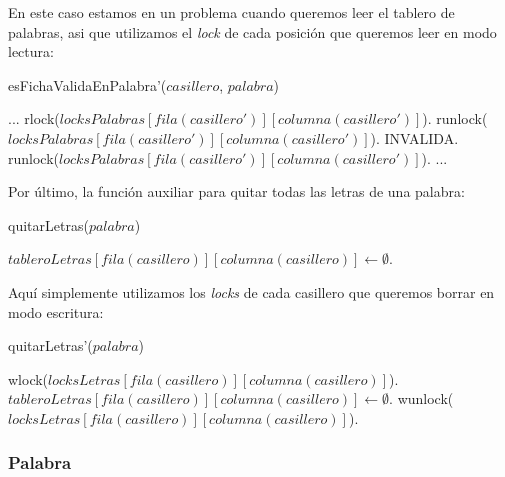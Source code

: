\noindent En este caso estamos en un problema cuando queremos leer el tablero de palabras, asi que utilizamos el \emph{lock} de cada posición que queremos leer en modo lectura:

\begin{algorithm}[H]
\caption{esFichaValidaEnPalabra'($casillero$, $palabra$)}
\begin{algorithmic}[1]
    \STATE ...
        \STATE rlock($locksPalabras[fila(casillero')][columna(casillero')]$).
            \STATE runlock($locksPalabras[fila(casillero')][columna(casillero')]$).
            \RETURN INVALIDA.
        \ENDIF
        \STATE runlock($locksPalabras[fila(casillero')][columna(casillero')]$).
    \ENDFOR
    \STATE ...
\end{algorithmic}
\end{algorithm}

Por último, la función auxiliar para quitar todas las letras de una palabra:

\begin{algorithm}[H]
\caption{quitarLetras($palabra$)}
\begin{algorithmic}[1]
        \STATE $tableroLetras[fila(casillero)][columna(casillero)] \leftarrow \emptyset$.
    \ENDFOR
\end{algorithmic}
\end{algorithm}

\noindent Aquí simplemente utilizamos los \emph{locks} de cada casillero que queremos borrar en modo escritura:

\begin{algorithm}[H]
\caption{quitarLetras'($palabra$)}
\begin{algorithmic}[1]
        \STATE wlock($locksLetras[fila(casillero)][columna(casillero)]$).
        \STATE $tableroLetras[fila(casillero)][columna(casillero)] \leftarrow \emptyset$.
        \STATE wunlock($locksLetras[fila(casillero)][columna(casillero)]$).
    \ENDFOR
\end{algorithmic}
\end{algorithm}

\subsubsection{Palabra}

